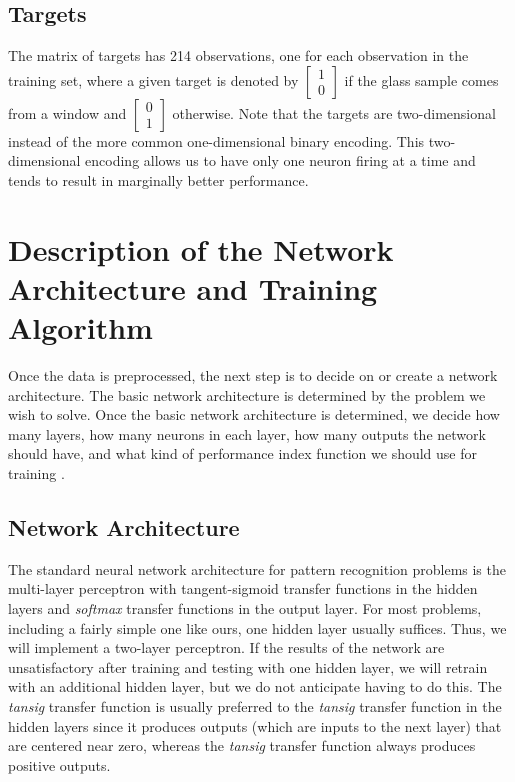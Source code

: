 \documentclass[12pt,halfline,a4paper]{ouparticle}
\begin{document}
\subsection{Targets}
\label{sec3.2}
The matrix of targets has 214 observations, one for each observation in the training set, where a given target is denoted by $\begin{bmatrix} 1 \\ 0 \end{bmatrix}$ if the glass sample comes from a window and $\begin{bmatrix} 0 \\ 1 \end{bmatrix}$ otherwise. Note that the targets are two-dimensional instead of the more common one-dimensional binary encoding. This two-dimensional encoding allows us to have only one neuron firing at a time and tends to result in marginally better performance. 

\section{Description of the Network Architecture and Training Algorithm}
\label{sec4}
Once the data is preprocessed, the next step is to decide on or create a network architecture. The basic network architecture is determined by the problem we wish to solve. Once the basic network architecture is determined, we decide how many layers, how many neurons in each layer, how many outputs the network should have, and what kind of performance index function we should use for training \cite{hagan2014}. 

\subsection{Network Architecture}
\label{sec4.1}
The standard neural network architecture for pattern recognition problems is the multi-layer perceptron with tangent-sigmoid transfer functions in the hidden layers and \emph{softmax} transfer functions in the output layer. For most problems, including a fairly simple one like ours, one hidden layer usually suffices. Thus, we will implement a two-layer perceptron. If the results of the network are unsatisfactory after training and testing with one hidden layer, we will retrain with an additional hidden layer, but we do not anticipate having to do this. The \emph{tansig} transfer function is usually preferred to the \emph{tansig} transfer function in the hidden layers since it produces outputs (which are inputs to the next layer) that are centered near zero, whereas the \emph{tansig} transfer function always produces positive outputs. 
\end{document}
